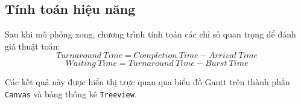 \documentclass[12pt, letterpaper]{article}
\begin{document}
\subsection{Tính toán hiệu năng}

Sau khi mô phỏng xong, chương trình tính toán các chỉ số quan trọng để đánh giá thuật toán:
\begin{equation}
    Turnaround\ Time = Completion\ Time - Arrival\ Time
\end{equation}
\begin{equation}
    Waiting\ Time = Turnaround\ Time - Burst\ Time
\end{equation}

Các kết quả này được hiển thị trực quan qua biểu đồ Gantt trên thành phần \texttt{Canvas} và bảng thống kê \texttt{Treeview}.
\end{document}
